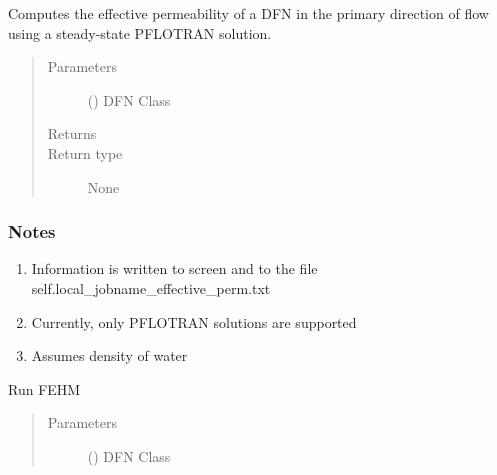\documentclass[letterpaper,10pt,english]{sphinxmanual}
\begin{document}
\begin{fulllineitems}
\begin{fulllineitems}
\label{\detokenize{pydfnworks:pydfnworks.general.dfnworks.DFNWORKS.effective_perm}}
Computes the effective permeability of a DFN in the primary direction of flow using a steady-state PFLOTRAN solution.
\begin{quote}\begin{description}
\item[{Parameters}] \leavevmode
{} () \textendash{} DFN Class

\item[{Returns}] \leavevmode


\item[{Return type}] \leavevmode
None

\end{description}\end{quote}
\subsubsection*{Notes}
\begin{enumerate}
\def\theenumi{\arabic{enumi}}
\def\labelenumi{\theenumi .}
\makeatletter\def\p@enumii{\p@enumi \theenumi .}\makeatother
\item {} 
Information is written to screen and to the file self.local\_jobname\_effective\_perm.txt

\item {} 
Currently, only PFLOTRAN solutions are supported

\item {} 
Assumes density of water

\end{enumerate}

\end{fulllineitems}


\begin{fulllineitems}
\label{\detokenize{pydfnworks:pydfnworks.general.dfnworks.DFNWORKS.fehm}}
Run FEHM
\begin{quote}\begin{description}
\item[{Parameters}] \leavevmode
{} () \textendash{} DFN Class


\end{description}
\end{quote}
\end{fulllineitems}
\end{fulllineitems}
\end{document}
